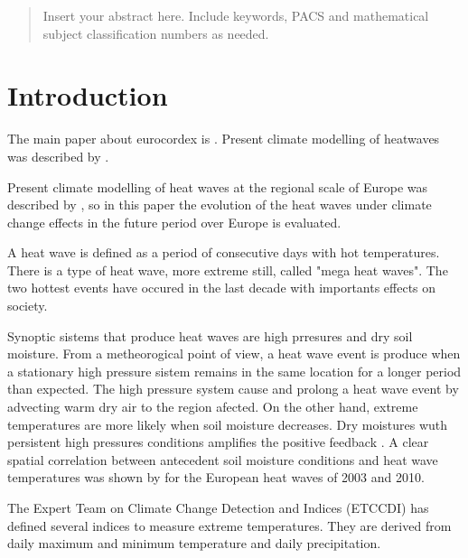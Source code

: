 \date{Received: date / Accepted: date}


\maketitle

\begin{abstract}
Insert your abstract here. Include keywords, PACS and mathematical
subject classification numbers as needed.
\end{abstract}

\section{Introduction}
\label{introduction}
The main paper about eurocordex is \cite{jac_al2014}. Present climate
modelling of heatwaves was described by \cite{vau_al2013}.

Present climate modelling of heat waves at the regional scale of Europe was described by \cite{vau_al2013}, so in this paper the evolution of the heat waves under climate change effects in the future period over Europe is evaluated.

A heat wave is defined as a period of consecutive days with hot temperatures. There is a type of heat wave, more extreme still, called "mega heat waves". The two hottest events have occured in the last decade \cite{bar_al2011} with importants effects on society. 

Synoptic sistems that produce heat waves are high prresures and dry soil moisture. From a metheorogical point of view, a heat wave event is produce when a stationary high pressure sistem remains in the same location for a longer period than expected. The high pressure system cause and prolong a heat wave event by advecting warm dry air to the region afected. On the other hand, extreme temperatures are more likely when soil moisture decreases. Dry moistures wuth persistent high pressures conditions amplifies the positive feedback \cite{per2015}. A clear spatial correlation between antecedent soil moisture conditions and heat wave temperatures was shown by \cite{Sil_al2017} for the European heat waves of 2003 and 2010. 
 

The Expert Team on Climate Change Detection and Indices (ETCCDI) has defined several indices to measure extreme temperatures. They are derived from daily maximum and minimum temperature and daily precipitation.    

